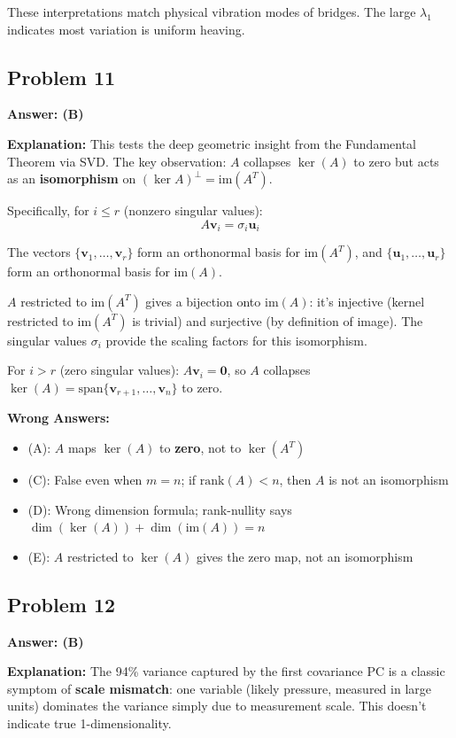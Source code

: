 \documentclass[12pt]{amsart}
\newcommand{\correct}[1]{{\color{correctgreen}\textbf{#1}}}
\begin{document}
\begin{itemize}
These interpretations match physical vibration modes of bridges. The large $\lambda_1$ indicates most variation is uniform heaving.

\subsection*{Problem 11}
\correct{Answer: (B)}

\textbf{Explanation:} This tests the deep geometric insight from the Fundamental Theorem via SVD. The key observation: $A$ collapses $\ker(A)$ to zero but acts as an \textbf{isomorphism} on $(\ker A)^\perp = \text{im}(A^T)$.

Specifically, for $i \leq r$ (nonzero singular values):
$$A\mathbf{v}_i = \sigma_i \mathbf{u}_i$$

The vectors $\{\mathbf{v}_1, \ldots, \mathbf{v}_r\}$ form an orthonormal basis for $\text{im}(A^T)$, and $\{\mathbf{u}_1, \ldots, \mathbf{u}_r\}$ form an orthonormal basis for $\text{im}(A)$.

$A$ restricted to $\text{im}(A^T)$ gives a bijection onto $\text{im}(A)$: it's injective (kernel restricted to $\text{im}(A^T)$ is trivial) and surjective (by definition of image). The singular values $\sigma_i$ provide the scaling factors for this isomorphism.

For $i > r$ (zero singular values): $A\mathbf{v}_i = \mathbf{0}$, so $A$ collapses $\ker(A) = \text{span}\{\mathbf{v}_{r+1}, \ldots, \mathbf{v}_n\}$ to zero.

\textbf{Wrong Answers:}
\begin{itemize}
\item (A): $A$ maps $\ker(A)$ to \textbf{zero}, not to $\ker(A^T)$
\item (C): False even when $m = n$; if $\text{rank}(A) < n$, then $A$ is not an isomorphism
\item (D): Wrong dimension formula; rank-nullity says $\dim(\ker(A)) + \dim(\text{im}(A)) = n$
\item (E): $A$ restricted to $\ker(A)$ gives the zero map, not an isomorphism
\end{itemize}

\subsection*{Problem 12}
\correct{Answer: (B)}

\textbf{Explanation:} The 94\% variance captured by the first covariance PC is a classic symptom of \textbf{scale mismatch}: one variable (likely pressure, measured in large units) dominates the variance simply due to measurement scale. This doesn't indicate true 1-dimensionality.


\end{itemize}
\end{document}
